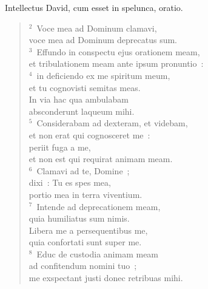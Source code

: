 \lettrine[lines=3,image=true,loversize=0.05,lraise=-0.03]{I}{}ntellectus David, cum esset in spelunca, oratio.
\begin{flushleft}\begin{verse}\vspace{6pt}${}^{2}$~Voce mea ad Dominum clamavi,\\ voce mea ad Dominum deprecatus sum.\\
${}^{3}$~Effundo in conspectu ejus orationem meam,\\ et tribulationem meam ante ipsum pronuntio~:\\
${}^{4}$~in deficiendo ex me spiritum meum,\\ et tu cognovisti semitas meas.\\ In via hac qua ambulabam\\ absconderunt laqueum mihi.\\
${}^{5}$~Considerabam ad dexteram, et videbam,\\ et non erat qui cognosceret me~:\\ periit fuga a me,\\ et non est qui requirat animam meam.\\
${}^{6}$~Clamavi ad te, Domine~;\\ dixi~: Tu es spes mea,\\ portio mea in terra viventium.\\
${}^{7}$~Intende ad deprecationem meam,\\ quia humiliatus sum nimis.\\ Libera me a persequentibus me,\\ quia confortati sunt super me.\\
${}^{8}$~Educ de custodia animam meam\\ ad confitendum nomini tuo~;\\ me exspectant justi donec retribuas mihi.\end{verse}\end{flushleft}




